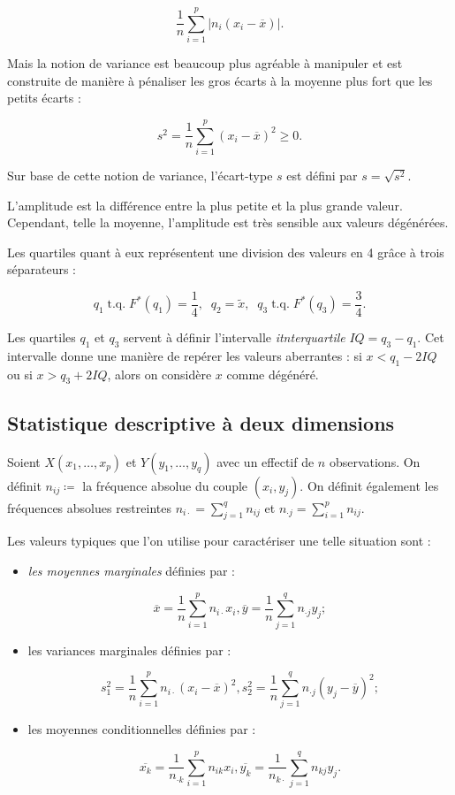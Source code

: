\documentclass{article}
\DeclareMathOperator{\tq}{\text{ t.q. }}
\begin{document}
			\[\frac 1n\sum_{i=1}^p|n_i(x_i-\overline x)|.\]

			Mais la notion de variance est beaucoup plus agréable à manipuler et est construite de manière à pénaliser les gros écarts à la moyenne plus fort que les petits
			écarts :

			\[s^2 = \frac 1n\sum_{i=1}^p(x_i-\overline x)^2 \geq 0.\]
			
			Sur base de cette notion de variance, l'écart-type $s$ est défini par $s = \sqrt{s^2}$.

			L'amplitude est la différence entre la plus petite et la plus grande valeur. Cependant, telle la moyenne, l'amplitude est très sensible aux valeurs dégénérées.

			Les quartiles quant à eux représentent une division des valeurs en 4 grâce à trois séparateurs :

			\[q_1 \tq F^*(q_1) = \frac 14, \;\;q_2 = \widetilde x,\;\; q_3 \tq F^*(q_3) = \frac 34.\]
			
			Les quartiles $q_1$ et $q_3$ servent à définir l'intervalle \textit{itnterquartile} $IQ = q_3-q_1$. Cet intervalle donne une manière de repérer les valeurs
			aberrantes : si $x < q_1 - 2IQ$ ou si $x > q_3 + 2IQ$, alors on considère $x$ comme dégénéré.
			
	\subsection{Statistique descriptive à deux dimensions}
		Soient $X(x_1, \ldots, x_p)$ et $Y(y_1, \ldots, y_q)$ avec un effectif de $n$ observations. On définit $n_{ij} \coloneqq$ la fréquence absolue du couple $(x_i, y_j)$.
		On définit également les fréquences absolues restreintes $n_{i \cdot} = \sum_{j=1}^qn_{ij}$ et $n_{\cdot j} = \sum_{i=1}^pn_{ij}$.
	   
		Les valeurs typiques que l'on utilise pour caractériser une telle situation sont :
		
		\begin{itemize}
			\item \textit{les moyennes marginales} définies par :

			\[\overline x = \frac 1n\sum_{i=1}^pn_{i\cdot}x_i, \overline y = \frac 1n \sum_{j=1}^qn_{\cdot j}y_j ;\]

			\item les variances marginales définies par :

			\[s_1^2 = \frac 1n\sum_{i=1}^pn_{i\cdot}(x_i-\overline x)^2, s_2^2 = \frac 1n\sum_{j=1}^qn_{\cdot j}(y_j-\overline y)^2 ;\]

			\item les moyennes conditionnelles définies par :

			\[\overline{x_k} = \frac 1{n_{\cdot k}}\sum_{i=1}^pn_{ik}x_i, \overline{y_k} = \frac 1{n_{k\cdot}} \sum_{j=1}^qn_{kj}y_j.\]
		\end{itemize}
	   
\end{document}
